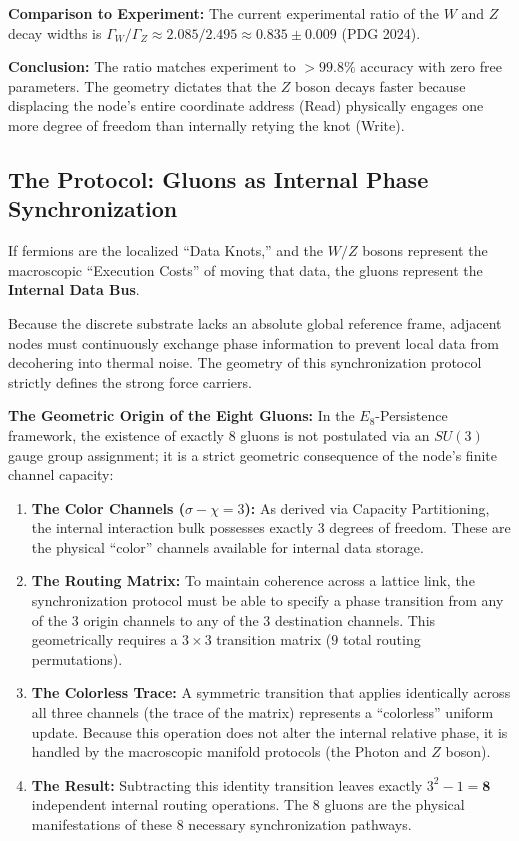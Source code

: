 \textbf{Comparison to Experiment:} The current experimental ratio of the $W$ and $Z$ decay widths is $\Gamma_W / \Gamma_Z \approx 2.085 / 2.495 \approx \mathbf{0.835 \pm 0.009}$ (PDG 2024). 

\textbf{Conclusion:} The ratio matches experiment to $> 99.8\%$ accuracy with zero free parameters. The geometry dictates that the $Z$ boson decays faster because displacing the node's entire coordinate address (Read) physically engages one more degree of freedom than internally retying the knot (Write).

\subsection{The Protocol: Gluons as Internal Phase Synchronization}

If fermions are the localized ``Data Knots,'' and the $W/Z$ bosons represent the macroscopic ``Execution Costs'' of moving that data, the gluons represent the \textbf{Internal Data Bus}. 

Because the discrete substrate lacks an absolute global reference frame, adjacent nodes must continuously exchange phase information to prevent local data from decohering into thermal noise. The geometry of this synchronization protocol strictly defines the strong force carriers.

\textbf{The Geometric Origin of the Eight Gluons:}
In the $E_8$-Persistence framework, the existence of exactly 8 gluons is not postulated via an $SU(3)$ gauge group assignment; it is a strict geometric consequence of the node's finite channel capacity:

\begin{enumerate}
    \item \textbf{The Color Channels ($\sigma - \chi = 3$):} As derived via Capacity Partitioning, the internal interaction bulk possesses exactly 3 degrees of freedom. These are the physical ``color'' channels available for internal data storage.
    \item \textbf{The Routing Matrix:} To maintain coherence across a lattice link, the synchronization protocol must be able to specify a phase transition from any of the 3 origin channels to any of the 3 destination channels. This geometrically requires a $3 \times 3$ transition matrix ($9$ total routing permutations).
    \item \textbf{The Colorless Trace:} A symmetric transition that applies identically across all three channels (the trace of the matrix) represents a ``colorless'' uniform update. Because this operation does not alter the internal relative phase, it is handled by the macroscopic manifold protocols (the Photon and $Z$ boson). 
    \item \textbf{The Result:} Subtracting this identity transition leaves exactly $3^2 - 1 = \mathbf{8}$ independent internal routing operations. The 8 gluons are the physical manifestations of these 8 necessary synchronization pathways.
\end{enumerate}

